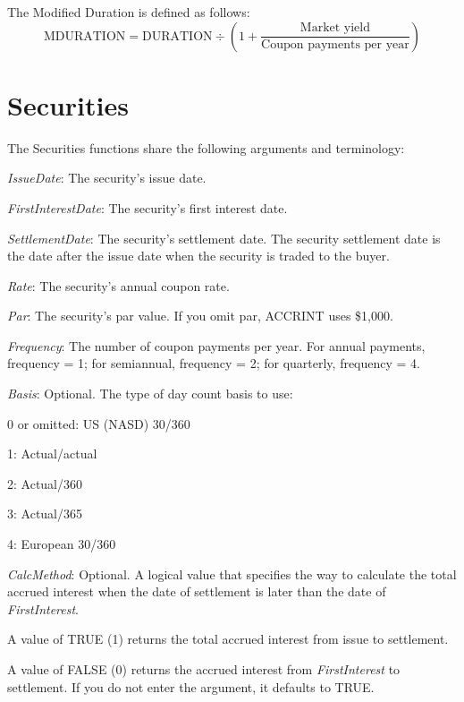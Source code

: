 \vspace{0.3cm}
The Modified Duration is defined as follows:
\begin{equation}
\text{MDURATION} = \text{DURATION} \div \left({1+\frac{\text{Market yield}}{\text{Coupon payments per year}}}\right)
\end{equation}






\newpage
\section{Securities}
The Securities functions share the following arguments and terminology:

\vspace{0.3cm}
\textit{IssueDate}: The security's issue date.

\textit{FirstInterestDate}: The security's first interest date.

\textit{SettlementDate}: The security's settlement date. The security settlement date is the date after the issue date when the security is traded to the buyer.

\textit{Rate}: The security's annual coupon rate.

\textit{Par}: The security's par value. If you omit par, ACCRINT uses \$1,000.

\textit{Frequency}: The number of coupon payments per year. For annual payments, frequency = 1; for semiannual, frequency = 2; for quarterly, frequency = 4.

\vspace{0.3cm}
\textit{Basis}:  Optional. The type of day count basis to use:

0 or omitted: US (NASD) 30/360 

1: Actual/actual 

2: Actual/360 

3: Actual/365 

4: European 30/360 

\vspace{0.3cm}
\textit{CalcMethod}:  Optional. A logical value that specifies the way to calculate the total accrued interest when the date of settlement is later than the date of \textit{FirstInterest}. 

A value of TRUE (1) returns the total accrued interest from issue to settlement. 

A value of FALSE (0) returns the accrued interest from \textit{FirstInterest} to settlement. If you do not enter the argument, it defaults to TRUE.

